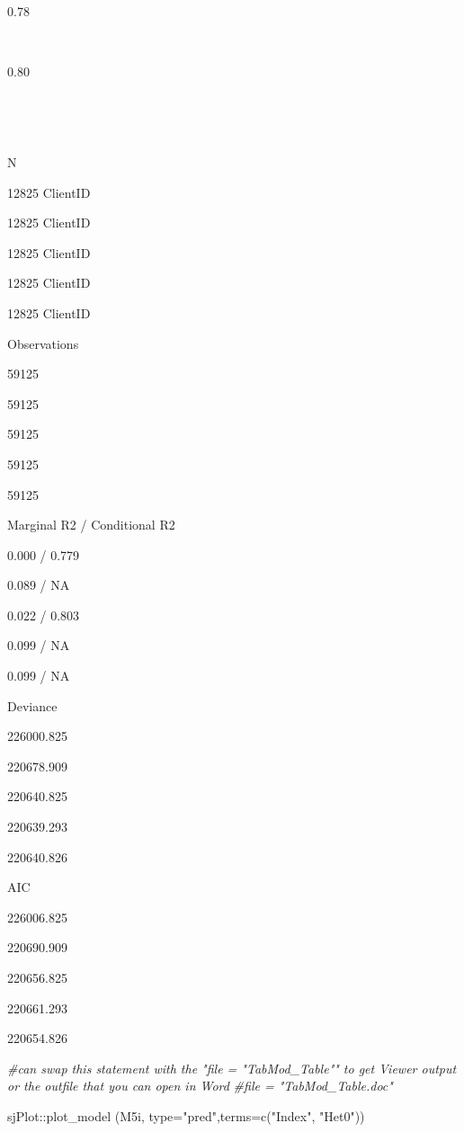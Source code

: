 \documentclass[
  11pt,
]{book}
\newenvironment{Shaded}{\begin{snugshade}}{\end{snugshade}}
\newcommand{\AttributeTok}[1]{\textcolor[rgb]{0.77,0.63,0.00}{#1}}
\newcommand{\CommentTok}[1]{\textcolor[rgb]{0.56,0.35,0.01}{\textit{#1}}}
\newcommand{\FunctionTok}[1]{\textcolor[rgb]{0.00,0.00,0.00}{#1}}
\newcommand{\NormalTok}[1]{#1}
\newcommand{\SpecialCharTok}[1]{\textcolor[rgb]{0.00,0.00,0.00}{#1}}
\newcommand{\StringTok}[1]{\textcolor[rgb]{0.31,0.60,0.02}{#1}}
\begin{document}
0.78

~

0.80

~

~

N

12825 ClientID

12825 ClientID

12825 ClientID

12825 ClientID

12825 ClientID

Observations

59125

59125

59125

59125

59125

Marginal R2 / Conditional R2

0.000 / 0.779

0.089 / NA

0.022 / 0.803

0.099 / NA

0.099 / NA

Deviance

226000.825

220678.909

220640.825

220639.293

220640.826

AIC

226006.825

220690.909

220656.825

220661.293

220654.826

\begin{Shaded}
\begin{Highlighting}[]
\CommentTok{\#can swap this statement with the "file = "TabMod\_Table"" to get Viewer output or the outfile that you can open in Word}
\CommentTok{\#file = "TabMod\_Table.doc"}
\end{Highlighting}
\end{Shaded}

\begin{Shaded}
\begin{Highlighting}[]
\NormalTok{sjPlot}\SpecialCharTok{::}\FunctionTok{plot\_model}\NormalTok{ (M5i, }\AttributeTok{type=}\StringTok{"pred"}\NormalTok{,}\AttributeTok{terms=}\FunctionTok{c}\NormalTok{(}\StringTok{"Index"}\NormalTok{, }\StringTok{"Het0"}\NormalTok{))}
\end{Highlighting}
\end{Shaded}
\end{document}
